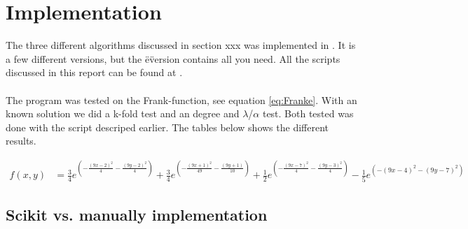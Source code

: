 
\pagebreak
\section{Implementation}

The three different algorithms discussed in section xxx was implemented in
\href{https://github.com/erikfsk/fysstk4155-project-1/blob/master/project/project-e.py}{\color{blue}{our script}}.
It is a few different versions, but the \"e\" version contains all you need.
All the scripts discussed in this report can be found at
\href{https://github.com/erikfsk/fysstk4155-project-1/}{\color{blue}{our github}}.
\\
\\
The program was tested on the Frank-function, see equation \ref{eq:Franke}.
With an known solution we did a k-fold test and an degree and $\lambda$/$\alpha$ test.
Both tested was done with the script descriped earlier.
The tables below shows the different results.

\begin{align}
f(x,y) &=
\frac{3}{4} e^{\left(-\frac{(9x-2)^2}{4} - \frac{(9y-2)^2}{4}\right)}
+\frac{3}{4} e^{\left(-\frac{(9x+1)^2}{49}- \frac{(9y+1)}{10}\right)}
+\frac{1}{2} e^{\left(-\frac{(9x-7)^2}{4} - \frac{(9y-3)^2}{4}\right)}
 -\frac{1}{5} e^{\left(-(9x-4)^2 - (9y-7)^2\right)}
\label{eq:Franke}
\end{align}

\subsection{Scikit vs. manually implementation}


